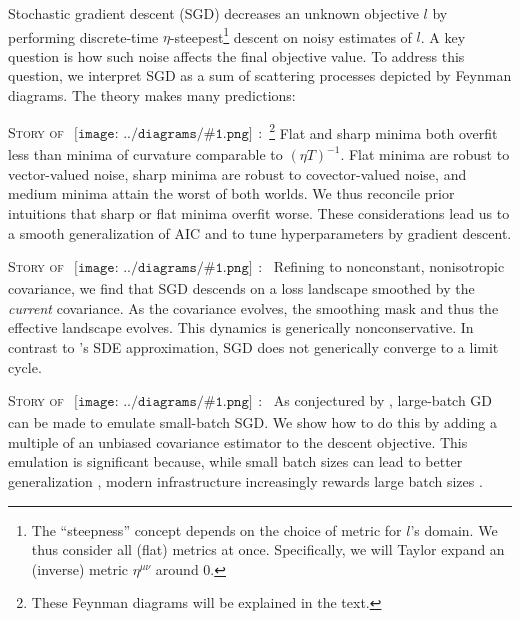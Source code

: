 \documentclass{article}
\newcommand{\sdia}[1]{\begin{gathered}\texttt{[image: ../diagrams/\#1.png]}\end{gathered}}
\begin{document}

        Stochastic gradient descent (SGD) decreases an unknown objective $l$ by
        performing discrete-time $\eta$-steepest\footnote{
            The ``steepness'' concept depends on the choice of metric for
            $l$'s domain.  We thus consider all (flat) metrics at once.
            Specifically, we will Taylor expand an (inverse) metric
            $\eta^{\mu\nu}$ around $0$.
        } descent on noisy estimates of $l$.
        A key question is how such noise affects the final objective value.
        To address this question, we interpret SGD as a sum of scattering
        processes depicted by Feynman diagrams.  The theory makes many
        predictions:

        \textsc{Story of $\sdia{c(01-2)(02-12)}$:~}\footnote{
            These Feynman diagrams will be explained in the text.
        }
        Flat and sharp minima both overfit less than minima of curvature
        comparable to $(\eta T)^{-1}$.  Flat minima are robust to
        vector-valued noise, sharp minima are robust to
        covector-valued noise, and medium minima attain the worst of both
        worlds.  We thus reconcile prior intuitions that sharp \citep{ ke17,
        wa18} or flat \citep{di17, wu18} minima overfit worse.  These
        considerations lead us to a smooth generalization of AIC and to tune
        hyperparameters by gradient descent.

        \textsc{Story of $\sdia{c(01-2-3)(02-12-23)}$:~}
        Refining \citet{we19b} to nonconstant, nonisotropic covariance, we find
        that SGD descends on a loss landscape smoothed by the \emph{current}
        covariance.  As the covariance evolves, the smoothing mask and thus the
        effective landscape evolves.  This dynamics is generically
        nonconservative.  In contrast to \citet{ch18}'s SDE approximation,
        SGD does not generically converge to a limit cycle. 

        \textsc{Story of $\sdia{c(01-2)(01-12)}$:~}
        As conjectured by \citet{ro18}, large-batch GD can be made to emulate
        small-batch SGD.  We show how to do this by adding a multiple of an
        unbiased covariance estimator to the descent objective.  This emulation
        is significant because, while small batch sizes can lead to better
        generalization \citep{bo91}, modern infrastructure increasingly rewards
        large batch sizes \citep{go18}.  
\end{document}
